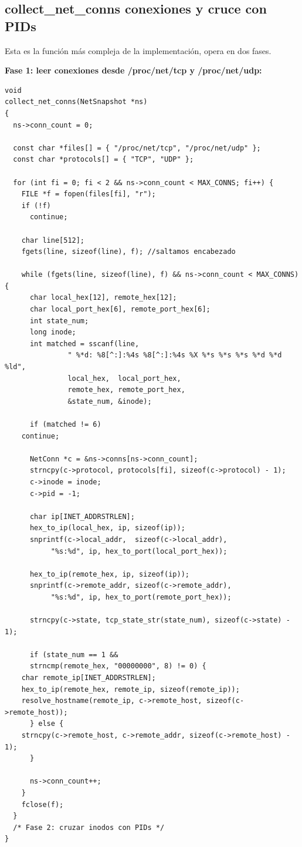 \documentclass[12pt,letterpaper]{article}
\begin{document}
\subsection*{collect\_net\_conns conexiones y cruce con PIDs}

Esta es la función más compleja de la implementación, opera en dos fases.

\medskip

\textbf{Fase 1: leer conexiones desde /proc/net/tcp y /proc/net/udp:}

\begin{lstlisting}[style=modernc, caption={\texttt{net\_monitor.c} collect\_net\_conns() fase 1}]
void
collect_net_conns(NetSnapshot *ns)
{
  ns->conn_count = 0;
    
  const char *files[] = { "/proc/net/tcp", "/proc/net/udp" };
  const char *protocols[] = { "TCP", "UDP" };
  
  for (int fi = 0; fi < 2 && ns->conn_count < MAX_CONNS; fi++) {
    FILE *f = fopen(files[fi], "r");
    if (!f)
      continue;
    
    char line[512];
    fgets(line, sizeof(line), f); //saltamos encabezado
    
    while (fgets(line, sizeof(line), f) && ns->conn_count < MAX_CONNS) {
      char local_hex[12], remote_hex[12];
      char local_port_hex[6], remote_port_hex[6];
      int state_num;
      long inode;
      int matched = sscanf(line,
			   " %*d: %8[^:]:%4s %8[^:]:%4s %X %*s %*s %*s %*d %*d %ld",
			   local_hex,  local_port_hex,
			   remote_hex, remote_port_hex,
			   &state_num, &inode);
      
      if (matched != 6)
	continue;
      
      NetConn *c = &ns->conns[ns->conn_count];
      strncpy(c->protocol, protocols[fi], sizeof(c->protocol) - 1);
      c->inode = inode;
      c->pid = -1;
      
      char ip[INET_ADDRSTRLEN];
      hex_to_ip(local_hex, ip, sizeof(ip));
      snprintf(c->local_addr,  sizeof(c->local_addr),
	       "%s:%d", ip, hex_to_port(local_port_hex));
      
      hex_to_ip(remote_hex, ip, sizeof(ip));
      snprintf(c->remote_addr, sizeof(c->remote_addr),
	       "%s:%d", ip, hex_to_port(remote_port_hex));
      
      strncpy(c->state, tcp_state_str(state_num), sizeof(c->state) - 1);
      
      if (state_num == 1 &&
	  strncmp(remote_hex, "00000000", 8) != 0) {
	char remote_ip[INET_ADDRSTRLEN];
	hex_to_ip(remote_hex, remote_ip, sizeof(remote_ip));
	resolve_hostname(remote_ip, c->remote_host, sizeof(c->remote_host));
      } else {
	strncpy(c->remote_host, c->remote_addr, sizeof(c->remote_host) - 1);
      }
      
      ns->conn_count++;
    }
    fclose(f);
  }
  /* Fase 2: cruzar inodos con PIDs */
}
\end{lstlisting}
\end{document}
